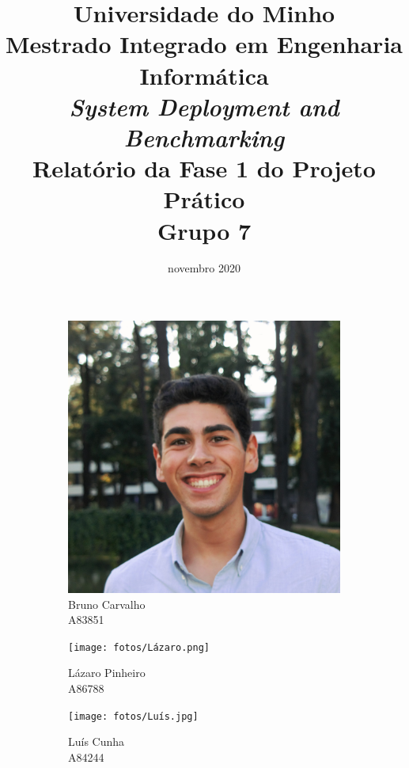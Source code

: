 \documentclass[a4paper, 11pt]{article}
\title{Universidade do Minho\\
       Mestrado Integrado em Engenharia Informática\\
       \textit{System Deployment and Benchmarking}\\
       Relatório da Fase 1 do Projeto Prático\\
       Grupo 7}
\date{novembro 2020}
\begin{document}
\maketitle


\begin{figure}[H]
    \centering
    \begin{subfigure}{0.3\textwidth}
        \includegraphics[scale=0.05]{fotos/Bruno.jpg}
        \caption*{Bruno Carvalho\\A83851}
    \end{subfigure}
    \begin{subfigure}{0.3\textwidth}
        \texttt{[image: fotos/Lázaro.png]}
        \caption*{Lázaro Pinheiro\\A86788}
    \end{subfigure}
    \begin{subfigure}{0.3\textwidth}
        \texttt{[image: fotos/Luís.jpg]}
        \caption*{Luís Cunha\\A84244}
    \end{subfigure}
    \begin{subfigure}{0.3\textwidth}

\end{subfigure}
\end{figure}
\end{document}
